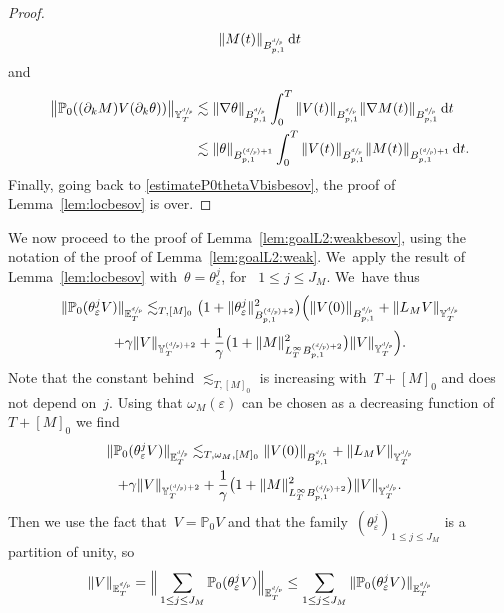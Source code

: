 \documentclass[10pt]{amsart}
\newcommand{\Psfrac}[2]{(\sfrac{#1}{#2})}
\theoremstyle{definition}
\newcommand\dd{\mathrm{d}}
\let\ep\varepsilon
\begin{document}
\begin{proof}
\[\begin{aligned}
\|M(t)\| _{ B^{\sfrac dp}_{p,1}} \, \dd t
\end{aligned}
\]
and
\[
\begin{aligned}
\big \| \mathbb{P}_0((\partial_k M) V(\partial_k\theta)) \big\|_{{\mathbb Y}^{\sfrac dp}_T } & \lesssim \|\nabla \theta\|_{ B^{\sfrac dp}_{p,1} } \int_0^T \| V(t)\|_{B^{\sfrac dp}_{p,1}}
\|\nabla M(t)\| _{ B^{\sfrac dp}_{p,1}} \, \dd t \\
& \lesssim \| \theta\|_{ B^{\Psfrac dp+1}_{p,1} } \int_0^T \| V(t)\|_{B^{\sfrac dp}_{p,1}}
\| M(t)\| _{ B^{\Psfrac dp+1}_{p,1}} \, \dd t.
\end{aligned}
\]
Finally, going back to \eqref{estimateP0thetaVbisbesov}, the proof of Lemma~\ref{lem:locbesov} is over.
\end{proof}

We now proceed to the proof of Lemma~\ref{lem:goalL2:weakbesov}, using the notation of the proof of Lemma~\ref{lem:goalL2:weak}. We~apply the result of Lemma~\ref{lem:locbesov} with~$\theta = \theta^{j}_\ep $, for ~$1 \leq j \leq J_M$. We~have thus
\begin{multline*}
\|\mathbb{P}_0(\theta^{j}_\ep V)\|_{{\mathbb E}^{\sfrac dp}_T} \lesssim_{T,[M]_0} \bigl(1+ \| \theta^{j}_\ep \|^2_{B^{\Psfrac dp+2}_{p,1}} \bigr)\Bigl(\| V (0)\|_{B^{\sfrac dp}_{p,1}} + \| L_{M }V\|_{{\mathbb Y}^{\sfrac dp}_T} \\+ \gamma \|V\|_{{{\mathbb Y}^{\Psfrac dp+2}_T }} +\frac 1 \gamma\bigl(1+ \|M\|^2_{{L^\infty_T B^{\Psfrac dp+2}_{p,1} }} \bigr) \| V \|_{{\mathbb Y}^{\sfrac dp}_T} \Bigr).
\end{multline*}
Note that the constant behind $\lesssim_{T,[M]_0}$ is increasing with~$T+[M]_0 $ and does not depend on~$j$. Using that $\omega_M(\ep)$ can be chosen as a decreasing function of~$T+[M]_0 $ we find
\begin{multline*}
\|\mathbb{P}_0(\theta^{j}_\ep V)\|_{{\mathbb E}^{\sfrac dp}_T} \lesssim_{T,\omega_M,[M]_0} \| V (0)\|_{B^{\sfrac dp}_{p,1}} + \| L_{M }V\|_{{\mathbb Y}^{\sfrac dp}_T} \\+ \gamma \|V\|_{{{\mathbb Y}^{\Psfrac dp+2}_T }} + \frac1\gamma\bigl(1+ \|M\|^2_{{L^\infty_T B^{\Psfrac dp+2}_{p,1} }} \bigr) \| V \|_{{\mathbb Y}^{\sfrac dp}_T}.
\end{multline*}
Then we use the fact that~$V = \mathbb{P}_0 V$ and that the family~$(\theta^{j}_\ep)_{1 \leq j \leq J_M}$ is a partition of unity, so
\[
\|V\|_{{\mathbb E}^{\sfrac dp}_T} = \Big \| \sum_{1 \leq j \leq J_M} \mathbb{P}_0 (\theta^{j}_\ep V)\Big\| _{{\mathbb E}^{\sfrac dp}_T} \leq \sum_{1 \leq j \leq J_M} \| \mathbb{P}_0 (\theta^{j}_\ep V)\| _{{\mathbb E}^{\sfrac dp}_T}
\]
\end{document}
